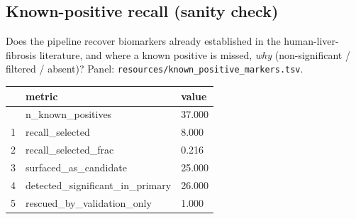 \documentclass[
  letterpaper,
  DIV=11,
  numbers=noendperiod]{scrartcl}
\newcounter{none} %
\begin{document}
\subsection{Known-positive recall (sanity
check)}\label{known-positive-recall-sanity-check}

Does the pipeline recover biomarkers already established in the
human-liver-fibrosis literature, and where a known positive is missed,
\emph{why} (non-significant / filtered / absent)? Panel:
\texttt{resources/known\_positive\_markers.tsv}.

{\def\LTcaptype{none} %
\begin{longtable}[]{@{}lll@{}}
\toprule\noalign{}
& metric & value \\
\midrule\noalign{}
\endhead
\bottomrule\noalign{}
\endlastfoot
0 & n\_known\_positives & 37.000 \\
1 & recall\_selected & 8.000 \\
2 & recall\_selected\_frac & 0.216 \\
3 & surfaced\_as\_candidate & 25.000 \\
4 & detected\_significant\_in\_primary & 26.000 \\
5 & rescued\_by\_validation\_only & 1.000 \\
\end{longtable}
}
\end{document}

